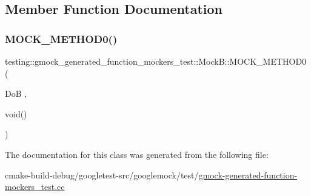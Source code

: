 \subsection{Member Function Documentation}
\mbox{\label{classtesting_1_1gmock__generated__function__mockers__test_1_1MockB_af0a5dcd462fc478e5e7a1ef503aafb05}} 
\subsubsection{\texorpdfstring{MOCK\_METHOD0()}{MOCK\_METHOD0()}}
{\footnotesize\ttfamily testing\+::gmock\+\_\+generated\+\_\+function\+\_\+mockers\+\_\+test\+::\+Mock\+B\+::\+M\+O\+C\+K\+\_\+\+M\+E\+T\+H\+O\+D0 (\begin{DoxyParamCaption}\item[{DoB}]{,  }\item[{void()}]{ }\end{DoxyParamCaption})}



The documentation for this class was generated from the following file\+:\begin{DoxyCompactItemize}
\item 
cmake-\/build-\/debug/googletest-\/src/googlemock/test/\mbox{\hyperlink{gmock-generated-function-mockers__test_8cc}{gmock-\/generated-\/function-\/mockers\+\_\+test.\+cc}}\end{DoxyCompactItemize}
